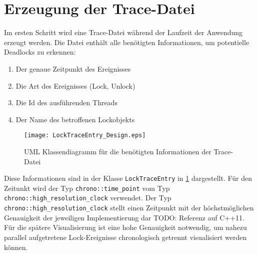 \section{Erzeugung der Trace-Datei}
\label{section:Erzeugung der Trace-Datei}
Im ersten Schritt wird eine Trace-Datei während der Laufzeit der Anwendung
erzeugt werden. Die Datei enthält alle benötigten Informationen, um potentielle
Deadlocks zu erkennen:

\begin{enumerate}
  \item Der genaue Zeitpunkt des Ereignisses 
  \item Die Art des Ereignisses (Lock, Unlock)
  \item Die Id des ausführenden Threads
  \item Der Name des betroffenen Lockobjekts
\end{enumerate}

\begin{figure}[ht]
  \texttt{[image: LockTraceEntry\_Design.eps]}
  \caption{UML Klassendiagramm für die benötigten Informationen der Trace-Datei}
  \label{fig:LockTraceEntry_Design}
\end{figure}

Diese Informationen sind in der Klasse \texttt{LockTraceEntry} in 
\cref{fig:LockTraceEntry_Design} dargestellt. Für den Zeitunkt wird der Typ 
\texttt{chrono::time\_point} vom Typ \texttt{chrono::high\_resolution\_clock}
verwendet. Der Typ \texttt{chrono::high\_resolution\_clock} stellt einen
Zeitpunkt mit der höchstmöglichen Genauigkeit der jeweiligen Implementierung dar
{TODO: Referenz auf C++11}. Für die spätere Visualisierung ist eine hohe
Genauigkeit notwendig, um nahezu parallel aufgetretene Lock-Ereignisse
chronologisch getrennt visualisiert werden können.


